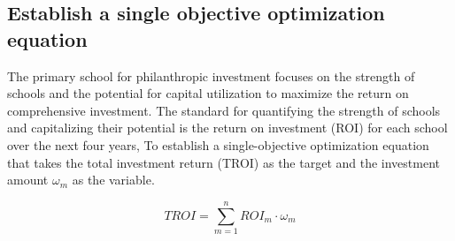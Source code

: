 \documentclass{mcmthesis}
\newcommand{\upcite}[1]{\textsuperscript{\textsuperscript{\cite{#1}}}}
\begin{document}
\subsection{Establish a single objective optimization equation\upcite{single}}

\par The primary school for philanthropic investment focuses on the strength of schools and the potential for capital utilization to maximize the return on comprehensive investment. The standard for quantifying the strength of schools and capitalizing their potential is the return on investment (ROI) for each school over the next four years, To establish a single-objective optimization equation that takes the total investment return (TROI) as the target and the investment amount $\omega_m$ as the variable.

\begin{equation}
	\label{eq20}
	TROI=\sum\limits^{n}_{m=1}ROI_m\cdot \omega_m
\end{equation}
\end{document}
